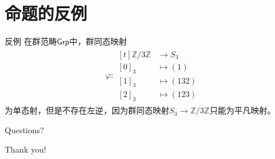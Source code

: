 \documentclass{beamer}
\newcommand{\Z}{\mathbb{Z}}            %
\begin{document}
\section{命题的反例}

\begin{frame}{反例}
	在群范畴$\mathsf{Grp}$中，群同态映射
	\begin{align*}
		\varphi:\begin{aligned}[t]
			\Z/3\Z &\longrightarrow S_3\\
			[0]_3 &\longmapsto (1)\\
			[1]_3 &\longmapsto (132)\\
			[2]_3 &\longmapsto (123)
		\end{aligned}
	\end{align*}
	为单态射，但是不存在左逆，因为群同态映射$S_3\to \Z/3\Z$只能为平凡映射。
\end{frame}

\begin{frame}[standout]
	Questions?
\end{frame}

\begin{frame}[standout]
	Thank you!
\end{frame}
\end{document}
